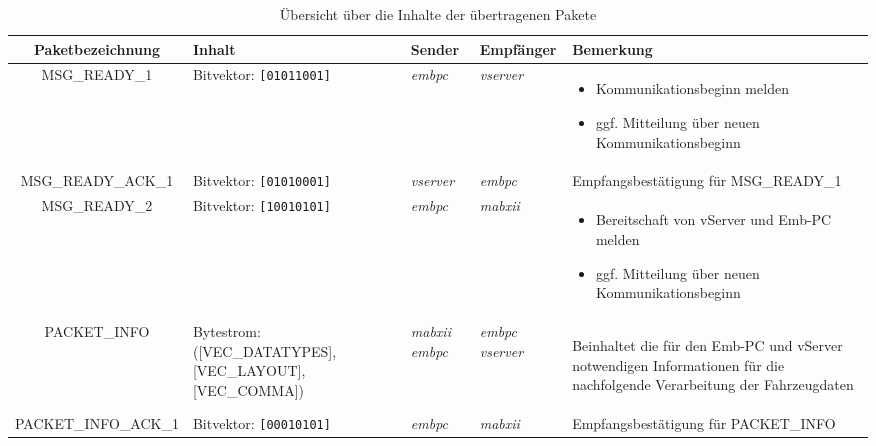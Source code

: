 \documentclass[fontsize = 12pt, paper = a4]{scrreprt}
\begin{document}
\begin{table}[H]
\centering

\caption{Übersicht über die Inhalte der übertragenen Pakete}

 \begin{tabular}{ c | p{4cm} | p{1.5cm} | p{2cm} | p{4cm} }
 
 \toprule[1.5pt]
 
 Paket\-bezeichnung & Inhalt & Sender & Empfänger & Bemerkung \\
 
 \midrule
 
MSG\_READY\_1 & Bitvektor: \texttt{[01011001]} & \emph{embpc} & \emph{vserver} &

\vspace*{-8mm}

\begin{itemize}[leftmargin=*] 

\item Kommunikations\-beginn melden
\item ggf. Mitteilung über neuen Kommunikationsbeginn

\end{itemize} \\

\midrule

MSG\_READY\_ACK\_1 & Bitvektor: \texttt{[01010001]} & \emph{vserver} & \emph{embpc} & Empfangsbestätigung für MSG\_READY\_1 \\

\midrule

MSG\_READY\_2 & Bitvektor: \texttt{[10010101]} & \emph{embpc} & \emph{mabxii} &

\vspace*{-8mm}

\begin{itemize}[leftmargin=*]
\item Bereitschaft von vServer und Emb-PC melden
\item ggf. Mitteilung über neuen Kommunikationsbeginn
\end{itemize} \\

\midrule

PACKET\_INFO & Bytestrom: ([VEC\_DATATYPES], [VEC\_LAYOUT], [VEC\_COMMA]) &
\emph{mabxii} \emph{embpc}& \emph{embpc} \emph{vserver} & 

\vspace*{-8mm}

\begin{flushleft}
Beinhaltet die für den Emb-PC und vServer notwendigen Informationen für die nachfolgende Verarbeitung der Fahrzeugdaten
\end{flushleft} \\

\midrule

PACKET\_INFO\_ACK\_1 & Bitvektor: \texttt{[00010101]} & \emph{embpc} & \emph{mabxii} & 
Empfangsbe\-stätigung für PACKET\_INFO \\

\bottomrule[1.5pt] 
 
\end{tabular}

\end{table}
\end{document}
